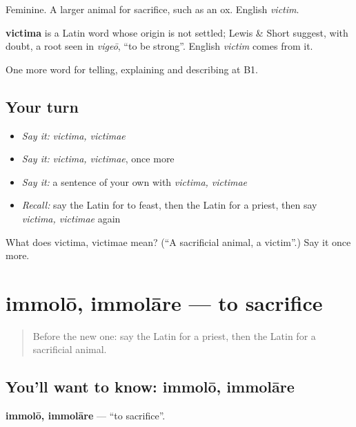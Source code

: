 Feminine. A larger animal for sacrifice, such as an ox. English \emph{victim}.

\begin{cousinweb}
\textbf{victima} is a Latin word whose origin is not settled; Lewis \& Short suggest, with doubt, a root seen in \emph{vigeō}, \textquotedblleft{}to be strong\textquotedblright{}. English \emph{victim} comes from it.
\end{cousinweb}

\begin{grammarlens}[title={What you've built}]
One more word for telling, explaining and describing at B1.
\end{grammarlens}

\subsection*{Your turn}
\begin{itemize}
\raggedright
  \item \emph{Say it:} \emph{victima, victimae}
  \item \emph{Say it:} \emph{victima, victimae}, once more
  \item \emph{Say it:} a sentence of your own with \emph{victima, victimae}
  \item \emph{Recall:} say the Latin for to feast, then the Latin for a priest, then say \emph{victima, victimae} again
\end{itemize}

\begin{tcolorbox}[breakable,colback=teal!4,colframe=teal!35!black,title={Before you move on}]
What does victima, victimae mean? (\textquotedblleft{}A sacrificial animal, a victim\textquotedblright{}.) Say it once more.
\end{tcolorbox}
\section[immolō, immolāre]{immolō, immolāre — to sacrifice}

\label{lesson:LA-C334-immolo}



\begin{quote}
Before the new one: say the Latin for a priest, then the Latin for a sacrificial animal.
\end{quote}

\subsection*{You'll want to know: immolō, immolāre}
\textbf{immolō, immolāre} — \textquotedblleft{}to sacrifice\textquotedblright{}.

